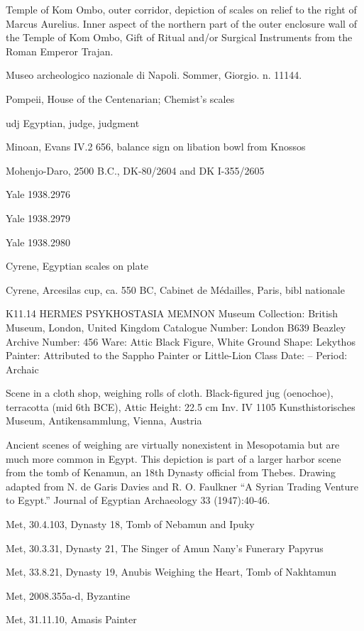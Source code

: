 \documentclass{article}
\begin{document}
Temple of Kom Ombo, outer corridor, depiction of scales on relief to the right of Marcus Aurelius.
Inner aspect of the northern part of the outer enclosure wall of the Temple of Kom Ombo,
Gift of Ritual and/or Surgical Instruments from the Roman Emperor Trajan.

Museo archeologico nazionale di Napoli. Sommer, Giorgio. n. 11144.

Pompeii, House of the Centenarian; Chemist's scales

udj Egyptian, judge, judgment

Minoan, Evans IV.2 656, balance sign on libation bowl from Knossos

Mohenjo-Daro, 2500 B.C., DK-80/2604 and DK I-355/2605

Yale 1938.2976

Yale 1938.2979

Yale 1938.2980

Cyrene, Egyptian scales on plate

Cyrene, Arcesilas cup, ca. 550 BC, Cabinet de M\'edailles, Paris, bibl nationale


K11.14 HERMES PSYKHOSTASIA  MEMNON
Museum Collection: British Museum, London, United Kingdom 
Catalogue Number: London B639 
Beazley Archive Number: 456
Ware: Attic Black Figure, White Ground 
Shape: Lekythos
Painter: Attributed to the Sappho Painter or Little-Lion Class 
Date: --
Period: Archaic

Scene in a cloth shop, weighing rolls of cloth. Black-figured jug (oenochoe), terracotta (mid 6th BCE), Attic Height: 22.5 cm Inv. IV 1105 Kunsthistorisches Museum, Antikensammlung, Vienna, Austria

Ancient scenes of weighing are virtually nonexistent in Mesopotamia but are much more common in Egypt. This depiction is part of a larger harbor scene from the tomb of Kenamun, an 18th Dynasty official from Thebes. Drawing adapted from N. de Garis Davies and R. O. Faulkner ``A Syrian Trading Venture to Egypt.'' Journal of Egyptian Archaeology 33 (1947):40-46.




Met, 30.4.103, Dynasty 18, Tomb of Nebamun and Ipuky

Met, 30.3.31, Dynasty 21, The Singer of Amun Nany's Funerary Papyrus

Met, 33.8.21, Dynasty 19, Anubis Weighing the Heart, Tomb of Nakhtamun

Met, 2008.355a-d, Byzantine

Met, 31.11.10, Amasis Painter
\end{document}
